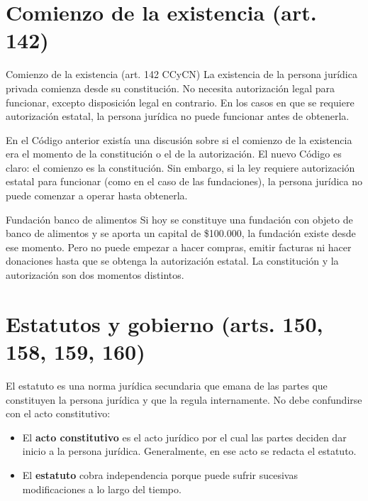 \documentclass[12pt,oneside]{book}
\begin{document}
\section{Comienzo de la existencia (art. 142)}

\begin{definition}{Comienzo de la existencia (art. 142 CCyCN)}
La existencia de la persona jurídica privada comienza desde su constitución. No necesita autorización legal para funcionar, excepto disposición legal en contrario. En los casos en que se requiere autorización estatal, la persona jurídica no puede funcionar antes de obtenerla.
\end{definition}

En el Código anterior existía una discusión sobre si el comienzo de la existencia era el momento de la constitución o el de la autorización. El nuevo Código es claro: el comienzo es la constitución. Sin embargo, si la ley requiere autorización estatal para funcionar (como en el caso de las fundaciones), la persona jurídica no puede comenzar a operar hasta obtenerla.

\begin{example}{Fundación banco de alimentos}
Si hoy se constituye una fundación con objeto de banco de alimentos y se aporta un capital de \$100.000, la fundación existe desde ese momento. Pero no puede empezar a hacer compras, emitir facturas ni hacer donaciones hasta que se obtenga la autorización estatal. La constitución y la autorización son dos momentos distintos.
\end{example}

\section{Estatutos y gobierno (arts. 150, 158, 159, 160)}

El estatuto es una norma jurídica secundaria que emana de las partes que constituyen la persona jurídica y que la regula internamente. No debe confundirse con el acto constitutivo:

\begin{itemize}
    \item El \textbf{acto constitutivo} es el acto jurídico por el cual las partes deciden dar inicio a la persona jurídica. Generalmente, en ese acto se redacta el estatuto.
    \item El \textbf{estatuto} cobra independencia porque puede sufrir sucesivas modificaciones a lo largo del tiempo.
\end{itemize}
\end{document}
